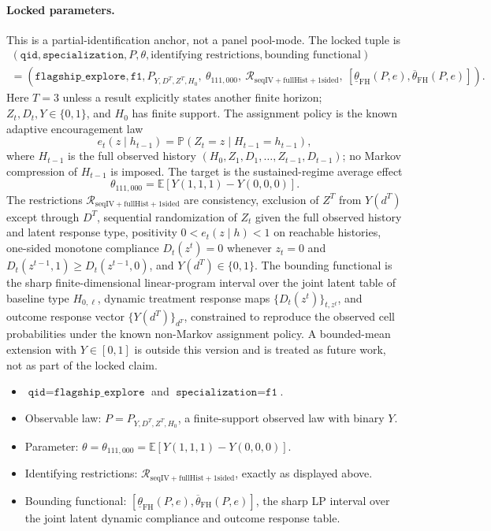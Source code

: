 \documentclass[11pt]{article}
\newcommand{\E}{\mathbb{E}}
\renewcommand{\Pr}{\mathbb{P}}
\theoremstyle{definition}
\theoremstyle{plain}
\theoremstyle{remark}
\begin{document}
\paragraph{Locked parameters.}
This is a partial-identification anchor, not a panel pool-mode.  The locked tuple is
\[
\begin{gathered}
(\texttt{qid},\texttt{specialization},P,\theta,\text{identifying restrictions},
  \text{bounding functional})\\
=
(\texttt{flagship\_explore},\texttt{f1},
  P_{Y,D^T,Z^T,H_0},\ \theta_{111,000},\
  \mathcal{R}_{\mathrm{seqIV+fullHist+1sided}},\
  [\underline\theta_{\mathrm{FH}}(P,e),\overline\theta_{\mathrm{FH}}(P,e)]) .
\end{gathered}
\]
Here \(T=3\) unless a result explicitly states another finite horizon; \(Z_t,D_t,Y\in\{0,1\}\), and \(H_0\) has finite support.  The assignment policy is the known adaptive encouragement law
\[
e_t(z\mid h_{t-1})=\Pr(Z_t=z\mid H_{t-1}=h_{t-1}),
\]
where \(H_{t-1}\) is the full observed history \((H_0,Z_1,D_1,\ldots,Z_{t-1},D_{t-1})\); no Markov compression of \(H_{t-1}\) is imposed.  The target is the sustained-regime average effect
\[
\theta_{111,000}=\E[Y(1,1,1)-Y(0,0,0)].
\]
The restrictions \(\mathcal{R}_{\mathrm{seqIV+fullHist+1sided}}\) are consistency, exclusion of \(Z^T\) from \(Y(d^T)\) except through \(D^T\), sequential randomization of \(Z_t\) given the full observed history and latent response type, positivity \(0<e_t(z\mid h)<1\) on reachable histories, one-sided monotone compliance \(D_t(z^t)=0\) whenever \(z_t=0\) and \(D_t(z^{t-1},1)\ge D_t(z^{t-1},0)\), and \(Y(d^T)\in\{0,1\}\).  The bounding functional is the sharp finite-dimensional linear-program interval over the joint latent table of baseline type \(H_{0,\ell}\), dynamic treatment response maps \(\{D_t(z^t)\}_{t,z^t}\), and outcome response vector \(\{Y(d^T)\}_{d^T}\), constrained to reproduce the observed cell probabilities under the known non-Markov assignment policy.  A bounded-mean extension with \(Y\in[0,1]\) is outside this version and is treated as future work, not as part of the locked claim.

\begin{itemize}[leftmargin=*]
\item \(\texttt{qid}=\texttt{flagship\_explore}\) and \(\texttt{specialization}=\texttt{f1}\).
\item Observable law: \(P=P_{Y,D^T,Z^T,H_0}\), a finite-support observed law with binary \(Y\).
\item Parameter: \(\theta=\theta_{111,000}=\E[Y(1,1,1)-Y(0,0,0)]\).
\item Identifying restrictions: \(\mathcal{R}_{\mathrm{seqIV+fullHist+1sided}}\), exactly as displayed above.
\item Bounding functional: \([\underline\theta_{\mathrm{FH}}(P,e),\overline\theta_{\mathrm{FH}}(P,e)]\), the sharp LP interval over the joint latent dynamic compliance and outcome response table.
\end{itemize}
\end{document}
